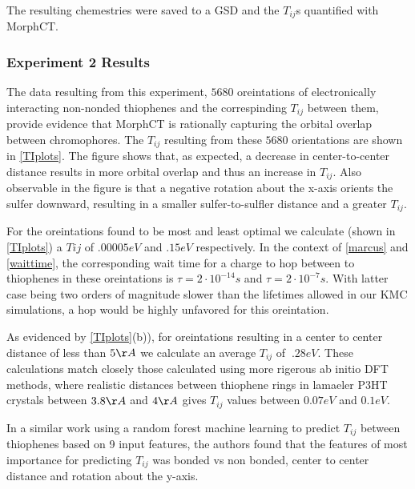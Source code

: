 The resulting chemestries were saved to a GSD and the $T_{ij}$s quantified with MorphCT. 

\subsubsection{Experiment 2 Results}

The data resulting from this experiment, $5680$ oreintations of electronically 
interacting non-nonded thiophenes and the
correspinding $T_{ij}$ between them, provide evidence that MorphCT is rationally capturing the orbital
overlap between chromophores. 
The $T_{ij}$ resulting from these $5680$ orientations are shown in \autoref{TIplots}. 
The figure shows that, as expected, a decrease in 
center-to-center distance results in more orbital overlap and thus an increase in $T_{ij}$. 
Also observable in the figure is that
a negative rotation about the x-axis orients the sulfer downward, resulting in a smaller sulfer-to-sulfler distance 
and a greater $T_{ij}$. 

For the oreintations found to be most and least optimal we calculate (shown in \autoref{TIplots})
a $T{ij}$ of $.00005eV$ and $.15eV$ respectively. In the context of \autoref{marcus} and \autoref{waittime},
the corresponding wait time for a charge to hop between to thiophenes in these oreintations is $\tau = 2
\cdot 10^{-14}s$ and $\tau = 2 \cdot 10^{-7}s$. With latter case being two orders of magnitude slower than the
lifetimes allowed in our KMC simulations, a hop would be highly unfavored for this oreintation. 

As evidenced by \autoref{TIplots}(b)), for oreintations resulting in a center to center distance of less than
$5\AA$ we calculate an average $T_{ij}$ of $~.28eV$.  
These calculations match closely those
calculated using more rigerous ab initio DFT methods\cite{Lan2008},
where realistic distances between thiophene rings in lamaeler P3HT crystals 
between $3.8\AA$ and $4 \AA$ gives $T_{ij}$ values between $0.07eV$ and $0.1eV$. 

In a similar work using a random forest machine learning to predict $T_{ij}$
between thiophenes based on 9 input features, the authors found that the
features of most importance for predicting $T_{ij}$ was bonded vs non bonded,
center to center distance and rotation about the y-axis. \cite{Jankowski2019c}

